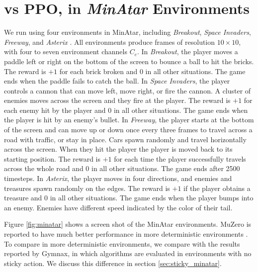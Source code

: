 \section{\moozi vs PPO, in \textit{MinAtar} Environments} \label{sec:exp:minatar}
We run \moozi using four environments in MinAtar, including \textit{Breakout}, \textit{Space Invaders}, \textit{Freeway}, and \textit{Asterix} \cite{MinAtarAtariInspiredTestbed_Young.Tian_2019}.
All environments produce frames of resolution $10 \times 10$, with four to seven environment channels $C_e$.
In \textit{Breakout}, the player moves a paddle left or right on the bottom of the screen to bounce a ball to hit the bricks.
The reward is $+1$ for each brick broken and $0$ in all other situations.
The game ends when the paddle fails to catch the ball.
In \textit{Space Invaders}, the player controls a cannon that can move left, move right, or fire the cannon.
A cluster of enemies moves across the screen and they fire at the player.
The reward is $+1$ for each enemy hit by the player and $0$ in all other situations.
The game ends when the player is hit by an enemy's bullet.
In \textit{Freeway}, the player starts at the bottom of the screen and can move up or down once every three frames to travel across a road with traffic, or stay in place.
Cars spawn randomly and travel horizontally across the screen.
When they hit the player the player is moved back to its starting position.
The reward is $+1$ for each time the player successfully travels across the whole road and $0$ in all other situations.
The game ends after 2500 timesteps.
In \textit{Asterix}, the player moves in four directions, and enemies and treasures spawn randomly on the edges.
The reward is $+1$ if the player obtains a treasure and $0$ in all other situations.
The game ends when the player bumps into an enemy.
Enemies have different speed indicated by the color of their tail.



Figure \ref{fig:minatar} shows a screen shot of the MinAtar environments.
MuZero is reported to have much better performance in more deterministic environments \cite{VectorQuantizedModels_Ozair.Li.ea_2021}.
To compare \moozi in more deterministic environments, we compare with the results reported by Gymnax, in which algorithms are evaluated in environments with no sticky action.
We discuss this difference in section \ref{sec:sticky_minatar}.

